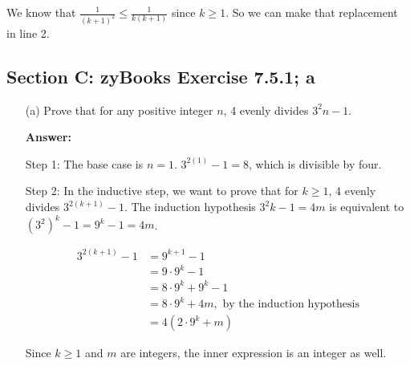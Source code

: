 \documentclass[14pt]{extreport}
\newcommand{\answer}[0]{\medskip \textbf{Answer:} \medskip}
\begin{document}
\begin{enumerate}
        We know that \( \frac{1}{(k + 1)^2} \leq \frac{1}{k(k + 1)} \) since \( k \geq 1 \). So we can make that replacement in line 2.
\end{enumerate}

\subsection*{Section C: zyBooks Exercise 7.5.1; a}

\begin{enumerate}
    
    \item[(a)] Prove that for any positive integer \( n \), 4 evenly divides \( 3^2n - 1 \).
    
        \answer

        Step 1: The base case is \( n = 1 \). \( 3^{2(1)} - 1 = 8 \), which is divisible by four.

        \medskip

        Step 2: In the inductive step, we want to prove that for \( k \geq 1 \), 4 evenly divides \( 3^{2(k+1)} - 1 \). The induction hypothesis \( 3^2k - 1 = 4m \) is equivalent to \( (3^2)^k - 1 = 9^k - 1 = 4m \).

        \begin{align*}
            3^{2(k+1)} - 1 &= 9^{k+1} - 1 \\
                           &= 9 \cdot 9^k - 1 \\
                           &= 8 \cdot 9^k + 9^k - 1 \\
                           &= 8 \cdot 9^k + 4m, \text{ by the induction hypothesis} \\
                           &= 4(2 \cdot 9^k + m)
        \end{align*}

        Since \( k \geq 1 \) and \( m \) are integers, the inner expression is an integer as well.
\end{enumerate}
\end{document}
